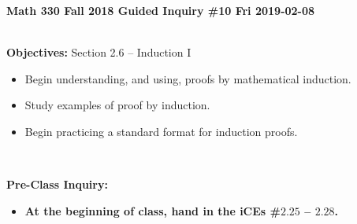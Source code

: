 \documentclass[12pt,letterpaper]{article}
\theoremstyle{definition}
\begin{document}
\noindent
\textbf{Math 330 Fall 2018 \hfill Guided Inquiry \#10 \hfill Fri 2019-02-08}

\vspace*{0.25cm}

\hrulefill\\

{\large\textbf{Objectives:} Section 2.6 -- Induction I}
\begin{itemize}
   \item Begin understanding, and using, proofs by mathematical induction.
   
   \item Study examples of proof by induction.
   
   \item Begin practicing a standard format for induction proofs.
         
\end{itemize}

\ \hrulefill

\textbf{\large Pre-Class Inquiry:}\hfill \\
\begin{itemize}
    \item \textbf{At the beginning of class, hand in the
        iCEs \#$\mathbf{2.25}$ -- $\mathbf{2.28}$.}
\end{itemize}
        
\end{document}
